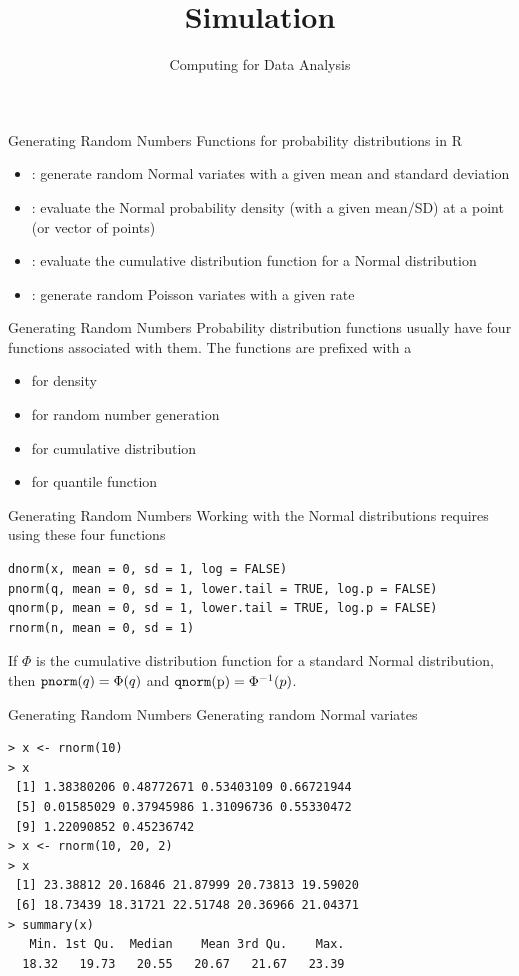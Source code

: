 \documentclass[aspectratio=169]{beamer}
\title[Simulation]{Simulation}
\date{Computing for Data Analysis}
\begin{document}
\begin{frame}
  \titlepage
\end{frame}

\begin{frame}{Generating Random Numbers}
  Functions for probability distributions in R
\begin{itemize}
  \item {}: generate random Normal variates with a
    given mean and standard deviation
  \item {}: evaluate the Normal probability density (with a
    given mean/SD) at a point (or vector of points)
  \item {}: evaluate the cumulative distribution function
    for a Normal distribution
  \item {}: generate random Poisson variates with a given
    rate
\end{itemize}
\end{frame}


\begin{frame}{Generating Random Numbers}
  Probability distribution functions usually have four functions
  associated with them. The functions are prefixed with a
\begin{itemize}
\item {} for density
\item {} for random number generation
\item {} for cumulative distribution
\item {} for quantile function
\end{itemize}
\end{frame}


\begin{frame}[fragile]{Generating Random Numbers}
Working with the Normal distributions requires using these four
functions
\begin{verbatim}
dnorm(x, mean = 0, sd = 1, log = FALSE)
pnorm(q, mean = 0, sd = 1, lower.tail = TRUE, log.p = FALSE)
qnorm(p, mean = 0, sd = 1, lower.tail = TRUE, log.p = FALSE)
rnorm(n, mean = 0, sd = 1)
\end{verbatim}
If $\Phi$ is the cumulative distribution function for a standard
Normal distribution, then $\text{\texttt{pnorm}}(q) = \Phi(q)$ and
$\text{\texttt{qnorm}(p)} = \Phi^{-1}(p)$.
\end{frame}

\begin{frame}[fragile]{Generating Random Numbers}
Generating random Normal variates
\begin{verbatim}
> x <- rnorm(10)
> x
 [1] 1.38380206 0.48772671 0.53403109 0.66721944
 [5] 0.01585029 0.37945986 1.31096736 0.55330472
 [9] 1.22090852 0.45236742
> x <- rnorm(10, 20, 2)
> x
 [1] 23.38812 20.16846 21.87999 20.73813 19.59020
 [6] 18.73439 18.31721 22.51748 20.36966 21.04371
> summary(x)
   Min. 1st Qu.  Median    Mean 3rd Qu.    Max. 
  18.32   19.73   20.55   20.67   21.67   23.39 
\end{verbatim}
\end{frame}
\end{document}

